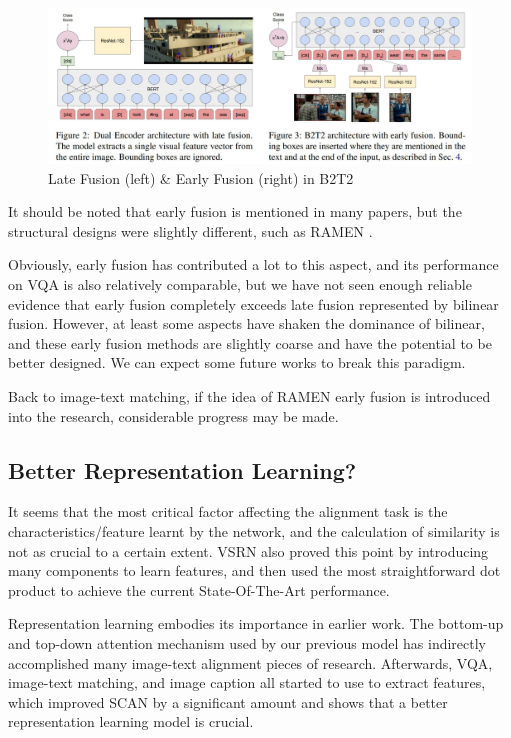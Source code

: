 \begin{figure}[h!]
\centering
\includegraphics[width=.95\textwidth]{fusion.pdf}
\caption{Late Fusion (left) \& Early Fusion (right) in B2T2 \cite{B2T2}}
\label{fig:fusionb2t2}
\end{figure}

It should be noted that early fusion is mentioned in many papers, but the structural designs were slightly different, such as RAMEN \cite{ramen}.

Obviously, early fusion has contributed a lot to this aspect, and its performance on VQA is also relatively comparable, but we have not seen enough reliable evidence that early fusion completely exceeds late fusion represented by bilinear fusion. However, at least some aspects have shaken the dominance of bilinear, and these early fusion methods are slightly coarse and have the potential to be better designed. We can expect some future works to break this paradigm.

Back to image-text matching, if the idea of RAMEN \cite{ramen} early fusion is introduced into the research, considerable progress may be made.

\subsection{Better Representation Learning?}

It seems that the most critical factor affecting the alignment task is the characteristics/feature learnt by the network, and the calculation of similarity is not as crucial to a certain extent. VSRN \cite{VSRN} also proved this point by introducing many components to learn features, and then used the most straightforward dot product to achieve the current State-Of-The-Art performance.

Representation learning embodies its importance in earlier work. The bottom-up and top-down \cite{bottomup} attention mechanism used by our previous model has indirectly accomplished many image-text alignment pieces of research. Afterwards, VQA, image-text matching, and image caption all started to use \cite{bottomup} to extract features, which improved SCAN \cite{scan} by a significant amount and shows that a better representation learning model is crucial.

